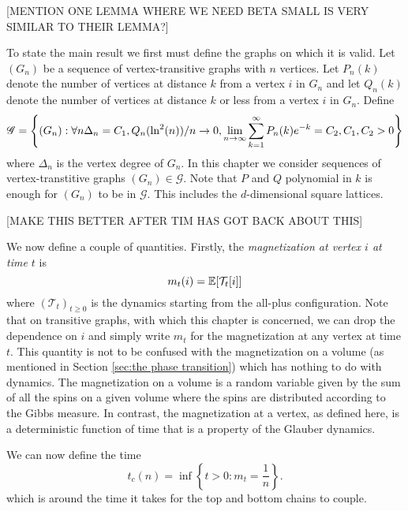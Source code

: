[MENTION ONE LEMMA WHERE WE NEED BETA SMALL IS VERY SIMILAR TO THEIR LEMMA?]

To state the main result we first must define the graphs on which it is valid. Let $(G_{n})$ be a sequence of vertex-transitive graphs with $n$ vertices. Let $P_n(k)$ denote the number of vertices at distance $k$ from a vertex $i$ in $G_n$ and let $Q_n(k)$ denote the number of vertices at distance $k$ or less from a vertex $i$ in $G_n$. Define
\begin{equation}
	\mathscr{G} = \left\{(G_n) : \forall n \Delta_n = C_1, Q_n(\ln^2(n))/n \rightarrow 0, \lim_{n \rightarrow \infty}\sum_{k = 1}^\infty P_n(k)e^{-k} = C_2, C_1, C_2 > 0\right\}
	\label{eq:set valid graphs}
\end{equation}
where $\Delta_n$ is the vertex degree of $G_n$.
In this chapter we consider sequences of vertex-transtitive graphs $(G_n) \in \mathscr{G}$. Note that $P$ and $Q$ polynomial in $k$ is enough for $(G_n)$ to be in $\mathscr{G}$. This includes the $d$-dimensional square lattices.

[MAKE THIS BETTER AFTER TIM HAS GOT BACK ABOUT THIS]

We now define a couple of quantities. Firstly, the \emph{magnetization at vertex $i$ at time $t$} is
\begin{equation}
	 	m_t(i) = \mathbb{E}[\mathcal{T}_t[i]]
\end{equation} 
where $(\mathcal{T}_t)_{t \geq 0}$ is the dynamics starting from the all-plus configuration. Note that on transitive graphs, with which this chapter is concerned, we can drop the dependence on $i$ and simply write $m_t$ for the magnetization at any vertex at time $t$. This quantity is not to be confused with the magnetization on a volume (as mentioned in Section \ref{sec:the phase transition}) which has nothing to do with dynamics. The magnetization on a volume is a random variable given by the sum of all the spins on a given volume where the spins are distributed according to the Gibbs measure. In contrast, the magnetization at a vertex, as defined here, is a deterministic function of time that is a property of the Glauber dynamics.

We can now define the time
\begin{equation}
	\label{eq:definition t_c(n)}
	t_c(n) = \inf\left\{ t > 0 : m_t = \frac{1}{n}\right\}.
\end{equation}
which is around the time it takes for the top and bottom chains to couple.

